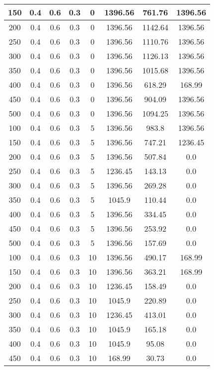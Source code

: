 \documentclass[a4paper, 12pt]{extreport}
\begin{document}
\begin{itemize}
\begin{longtable}{|c|c|c|c|c|c|c|c|}
			150 & 0.4 & 0.6 & 0.3 & 0 & 1396.56 & 761.76 & 1396.56 \\\hline
			200 & 0.4 & 0.6 & 0.3 & 0 & 1396.56 & 1142.64 & 1396.56 \\\hline
			250 & 0.4 & 0.6 & 0.3 & 0 & 1396.56 & 1110.76 & 1396.56 \\\hline
			300 & 0.4 & 0.6 & 0.3 & 0 & 1396.56 & 1126.13 & 1396.56 \\\hline
			350 & 0.4 & 0.6 & 0.3 & 0 & 1396.56 & 1015.68 & 1396.56 \\\hline
			400 & 0.4 & 0.6 & 0.3 & 0 & 1396.56 & 618.29 & 168.99 \\\hline
			450 & 0.4 & 0.6 & 0.3 & 0 & 1396.56 & 904.09 & 1396.56 \\\hline
			500 & 0.4 & 0.6 & 0.3 & 0 & 1396.56 & 1094.25 & 1396.56 \\\hline
			100 & 0.4 & 0.6 & 0.3 & 5 & 1396.56 & 983.8 & 1396.56 \\\hline
			150 & 0.4 & 0.6 & 0.3 & 5 & 1396.56 & 747.21 & 1236.45 \\\hline
			200 & 0.4 & 0.6 & 0.3 & 5 & 1396.56 & 507.84 & 0.0 \\\hline
			250 & 0.4 & 0.6 & 0.3 & 5 & 1236.45 & 143.13 & 0.0 \\\hline
			300 & 0.4 & 0.6 & 0.3 & 5 & 1396.56 & 269.28 & 0.0 \\\hline
			350 & 0.4 & 0.6 & 0.3 & 5 & 1045.9 & 110.44 & 0.0 \\\hline
			400 & 0.4 & 0.6 & 0.3 & 5 & 1396.56 & 334.45 & 0.0 \\\hline
			450 & 0.4 & 0.6 & 0.3 & 5 & 1396.56 & 253.92 & 0.0 \\\hline
			500 & 0.4 & 0.6 & 0.3 & 5 & 1396.56 & 157.69 & 0.0 \\\hline
			100 & 0.4 & 0.6 & 0.3 & 10 & 1396.56 & 490.17 & 168.99 \\\hline
			150 & 0.4 & 0.6 & 0.3 & 10 & 1396.56 & 363.21 & 168.99 \\\hline
			200 & 0.4 & 0.6 & 0.3 & 10 & 1236.45 & 158.49 & 0.0 \\\hline
			250 & 0.4 & 0.6 & 0.3 & 10 & 1045.9 & 220.89 & 0.0 \\\hline
			300 & 0.4 & 0.6 & 0.3 & 10 & 1236.45 & 413.01 & 0.0 \\\hline
			350 & 0.4 & 0.6 & 0.3 & 10 & 1045.9 & 165.18 & 0.0 \\\hline
			400 & 0.4 & 0.6 & 0.3 & 10 & 1045.9 & 95.08 & 0.0 \\\hline
			450 & 0.4 & 0.6 & 0.3 & 10 & 168.99 & 30.73 & 0.0 \\\hline

\end{longtable}
\end{itemize}
\end{document}
